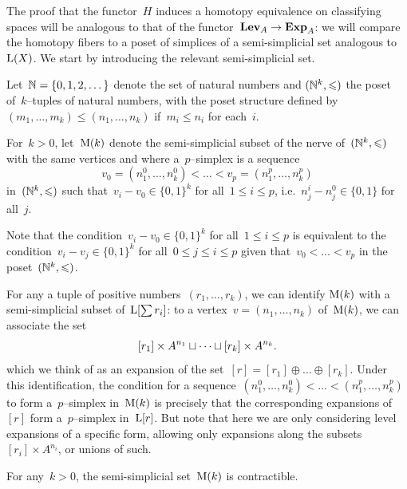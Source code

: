 The proof that the functor~$H$ induces a homotopy equivalence on classifying spaces will be analogous to that of the functor~$\mathbf{Lev}_A\to \mathbf{Exp}_A$: we will compare the homotopy fibers to  a poset of simplices of a semi-simplicial set analogous to~$\mathrm{L}(X)$. %
We start by introducing the relevant semi-simplicial set. 

Let~$\mathbb{N}=\{0,1,2,\dots\}$ denote the set of  natural numbers and  
$(\mathbb{N}^k,\leqslant)$ the poset of~$k$--tuples of natural numbers, with the poset structure defined by~$(m_1,\dots,m_k)\le (n_1,\dots,n_k)$ if~$m_i\le n_i$ for each~$i$. 

\begin{definition}
For~$k> 0$, let~$\mathrm{M}(k)$ denote the semi-simplicial subset of the nerve of~$(\mathbb{N}^{k},\leqslant)$ with 
the same vertices and where a~$p$--simplex is a sequence 
\[
v_0= (n_1^0,\dots,n^0_{k})<\dots <  v_p=(n^p_1,\dots,n^p_{k})
\]
in~$(\mathbb{N}^{k},\leqslant)$ such that~$v_i -v_0\in \{0,1\}^k$ for all~$1\le i\le p$, i.e.~$n_j^i-n_j^0\in\{0,1\}$ for all~$j$.  
\end{definition}



Note that the condition~$v_i -v_0\in \{0,1\}^k$ for all~$1\le i\le p$ is equivalent to the condition~$v_i -v_j\in \{0,1\}^k$ for all~$0\le j\le  i\le p$ given that~$v_0<\dots<v_p$ in the poset~$(\mathbb{N}^k,\leqslant)$. 

For any a tuple of positive numbers~$(r_1,\dots,r_k)$, we can identify $\mathrm{M}(k)$ with a semi-simplicial subset of~$\mathrm{L}[\sum r_i]$: to a vertex~$v=(n_1,\dots,n_k)$ of~$\mathrm{M}(k)$, we can associate the set  
$$[r_1]\times A^{n_1}\sqcup \dots \sqcup [r_k]\times A^{n_k}.$$
which we think of as an expansion of the set~$[r]=[r_1]\oplus \dots\oplus [r_k]$. Under this identification, the condition for a sequence~\hbox{$(n_1^0,\dots,n^0_k)<\dots <(n^p_1,\dots,n^p_k)$} to form a~$p$--simplex in~$\mathrm{M}(k)$ 
is precisely that the corresponding expansions of~$[r]$ form a~$p$--simplex in~$\mathrm{L}[r]$. But note that here we are only considering level expansions of a specific form, allowing only expansions along the subsets~$[r_i]\times A^{n_i}$, or unions of such. 

\begin{lem}\label{lem:Lk}
For any~$k> 0$, the semi-simplicial set~$\mathrm{M}(k)$ is contractible. 
\end{lem}

